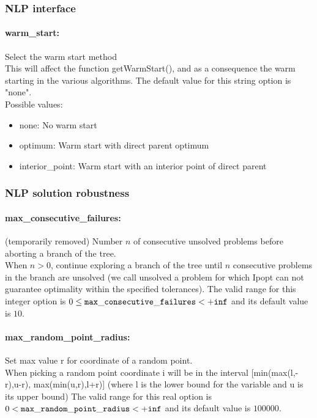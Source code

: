 \subsubsection{NLP interface}
\label{sec:NLP_interface}

\paragraph{warm\_start:}\label{sec:warm_start} Select the warm start method $\;$ \\
 This will affect the function getWarmStart(), and
as a consequence the warm starting in the various
algorithms.
The default value for this string option is "none".
\\ 
Possible values:
\begin{itemize}
   \item none: No warm start
   \item optimum: Warm start with direct parent optimum
   \item interior\_point: Warm start with an interior point of direct
parent
\end{itemize}

\subsubsection{NLP solution robustness}
\label{sec:NLP_solution_robustness}

\paragraph{max\_consecutive\_failures:}\label{sec:max_consecutive_failures} (temporarily removed) Number $n$ of consecutive unsolved problems before aborting a branch of the tree. $\;$ \\
 When $n > 0$, continue exploring a branch of the
tree until $n$ consecutive problems in the branch
are unsolved (we call unsolved a problem for
which Ipopt can not guarantee optimality within
the specified tolerances). The valid range for this integer option is
$0 \le {\tt max\_consecutive\_failures } <  {\tt +inf}$
and its default value is $10$.


\paragraph{max\_random\_point\_radius:}\label{sec:max_random_point_radius} Set max value r for coordinate of a random point. $\;$ \\
 When picking a random point coordinate i will be
in the interval [min(max(l,-r),u-r),
max(min(u,r),l+r)] (where l is the lower bound
for the variable and u is its upper bound) The valid range for this real option is 
$0 <  {\tt max\_random\_point\_radius } <  {\tt +inf}$
and its default value is $100000$.


